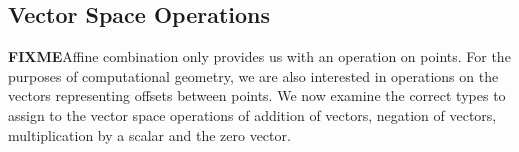 
\subsection{Vector Space Operations}
\label{sec:vector-space-ops}

\textbf{FIXME}Affine combination only provides us with an operation on
points. For the purposes of computational geometry, we are also
interested in operations on the vectors representing offsets between
points. We now examine the correct types to assign to the vector space
operations of addition of vectors, negation of vectors, multiplication
by a scalar and the zero vector.

